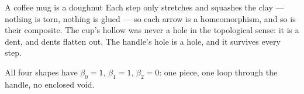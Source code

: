 \documentclass[10pt,aspectratio=169]{beamer}
\begin{document}
\begin{frame}{A coffee mug is a doughnut}
        \vspace{0.8em}
        \small
        Each step only stretches and squashes the clay --- nothing is torn, nothing is
        glued --- so each arrow is a homeomorphism, and so is their composite. The cup's
        hollow was never a hole in the topological sense: it is a dent, and dents flatten
        out. The handle's hole is a hole, and it survives every step.

        \vspace{0.6em}
        \begin{center}
            \alert{All four shapes have $\beta_0=1$, $\beta_1=1$, $\beta_2=0$}: one piece,
            one loop through the handle, no enclosed void.
        \end{center}
    \end{frame}
\end{document}
